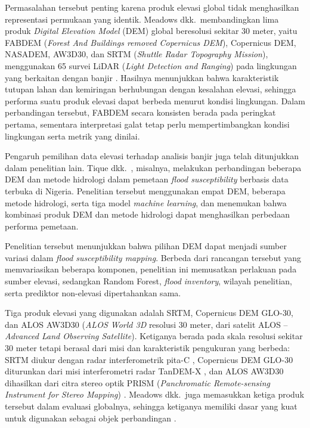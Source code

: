 \documentclass[12pt]{article}
\begin{document}
Permasalahan tersebut penting karena produk elevasi global tidak menghasilkan
representasi permukaan yang identik. Meadows dkk.\ membandingkan lima produk
\textit{Digital Elevation Model} (DEM) global beresolusi sekitar 30 meter,
yaitu FABDEM (\textit{Forest And Buildings removed Copernicus DEM}),
Copernicus DEM, NASADEM, AW3D30, dan SRTM (\textit{Shuttle Radar Topography
Mission}), menggunakan 65 survei LiDAR (\textit{Light Detection and Ranging})
pada lingkungan yang
berkaitan dengan banjir \cite{meadows2024}. Hasilnya menunjukkan bahwa
karakteristik tutupan lahan dan kemiringan berhubungan dengan kesalahan
elevasi, sehingga performa suatu produk elevasi dapat berbeda menurut kondisi
lingkungan. Dalam perbandingan tersebut, FABDEM secara konsisten berada
pada peringkat pertama, sementara interpretasi galat tetap perlu
mempertimbangkan kondisi lingkungan serta metrik yang dinilai.

Pengaruh pemilihan data elevasi terhadap analisis banjir juga telah
ditunjukkan dalam penelitian lain. Tique dkk.\ \cite{Tique2026}, misalnya,
melakukan perbandingan beberapa DEM dan metode hidrologi dalam pemetaan
\textit{flood susceptibility} berbasis data terbuka di Nigeria. Penelitian tersebut
menggunakan empat DEM, beberapa metode hidrologi, serta tiga model
\textit{machine learning}, dan menemukan bahwa kombinasi produk DEM dan
metode hidrologi dapat menghasilkan perbedaan performa pemetaan.

Penelitian tersebut menunjukkan bahwa pilihan DEM dapat menjadi sumber
variasi dalam \textit{flood susceptibility mapping}. Berbeda dari rancangan
tersebut yang memvariasikan beberapa komponen, penelitian ini memusatkan
perlakuan pada sumber elevasi, sedangkan Random Forest, \textit{flood inventory},
wilayah penelitian, serta prediktor non-elevasi dipertahankan sama.

Tiga produk elevasi yang digunakan adalah SRTM, Copernicus DEM GLO-30, dan
ALOS AW3D30 (\textit{ALOS World 3D} resolusi 30 meter, dari satelit
ALOS -- \textit{Advanced Land Observing Satellite}). Ketiganya berada pada
skala resolusi sekitar 30 meter tetapi
berasal dari misi dan karakteristik pengukuran yang berbeda: SRTM diukur
dengan radar interferometrik pita-C \cite{farr2007}, Copernicus DEM GLO-30
diturunkan dari misi interferometri radar TanDEM-X \cite{esa_glo30}, dan
ALOS AW3D30 dihasilkan dari citra stereo optik PRISM
(\textit{Panchromatic Remote-sensing Instrument for Stereo Mapping})
\cite{tadono2016}. Meadows dkk.\ juga
memasukkan ketiga produk tersebut dalam evaluasi globalnya, sehingga ketiganya
memiliki dasar yang kuat untuk digunakan sebagai objek perbandingan
\cite{meadows2024}.
\end{document}
